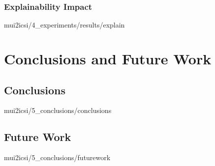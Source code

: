 \documentclass[english,epsbased,copyright,final,printable,covers,extendedindex,firstnumbered,tfm,gnuplot,loc,loe,lof,lot]{tfgtfmthesisuam}
\begin{document}
      \subsection{Explainability Impact\label{SS:EXPLAIN}}{mui2icsi/4_experiments/results/explain}

  \chapter{Conclusions and Future Work\label{CAP:CONCLUSIONS}}
    \section{Conclusions\label{SEC:CONCLUSIONS}}{mui2icsi/5_conclusions/conclusions}

    \section{Future Work\label{SEC:FUTUREWORK}}{mui2icsi/5_conclusions/futurework}

  \appendix
\end{document}

